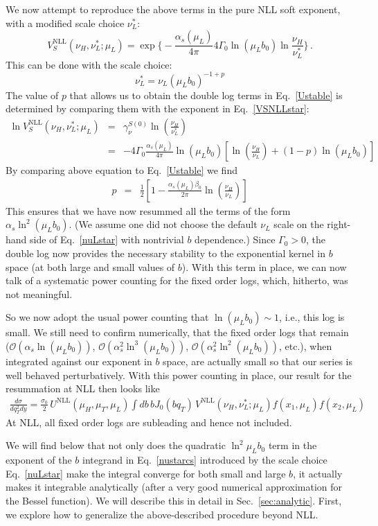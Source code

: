 \documentclass[a4,letterpaper,11pt]{article}
\newcommand{\nn}{\nonumber}
\newcommand{\be}{\begin{equation}}
\newcommand{\ee}{\end{equation}}
\newcommand{\bea}{\begin{eqnarray}}
\newcommand{\eea}{\end{eqnarray}}
\newcommand{\as}{\alpha_s}
\newcommand{\cO}{\mathcal{O}}
\newcommand{\eq}[1]{Eq.~\eqref{#1}}
\renewcommand{\sec}[1]{Sec.~\ref{sec:#1}}
\begin{document}
We now attempt to reproduce the above terms in the pure NLL soft exponent, with a modified scale choice $\nu_L^*$: 
\be
\label{VSNLLstar}
V_S^{\text{NLL}}(\nu_H,\nu_L^*;\mu_L)  =\exp\biggl\{ - \frac{\as(\mu_L)}{4\pi}4\Gamma_0 \ln(\mu_L b_0) \ln\frac{\nu_H}{\nu_L^*}\biggr\}\,.
\ee
This can be done with the scale choice:
\be\label{nuLstar}
  \nu_L^* = \nu_L (\mu_L b_0)^{-1+p} 
\ee 
The value of $p$ that allows us to obtain the double log terms in \eq{Ustable} is determined by comparing them with the exponent in \eq{VSNLLstar}: 
\bea \label{VSNLL}
\ln V_S^\text{NLL}(\nu_H,\nu_L^*;\mu_L) &= & \gamma_\nu^{S (0)} \ln\left(\frac{\nu_H}{\nu_L^*}\right)
\nn\\
&=& -4\Gamma_0 \frac{\as(\mu_L)}{4\pi}\ln(\mu_L b_0) \left[
\ln\left(\frac{\nu_H}{\nu_L}\right)+(1-p)\ln(\mu_L b_0)
\right]
\eea
By comparing above equation to \eq{Ustable} we find
\bea
p&=& 
\frac{1}{2}\left[1-  \frac{\as(\mu_L) \beta_0}{2\pi}\ln\left(\frac{\nu_H}{\nu_L}\right)\right]
\label{eq:n}
\eea
This ensures that we have now resummed all the terms of the form $\as \ln^2(\mu_L b_0)$. (We assume one did not choose the default $\nu_L$ scale on the right-hand side of \eq{nuLstar} with nontrivial $b$ dependence.)
Since $\Gamma_0>0$, the double log now provides the necessary stability to the exponential kernel in $b$ space (at both large and small values of $b$). With this term in place, we can now talk of a systematic power counting for the fixed order logs, which, hitherto, was not meaningful. 


So we now  adopt the usual power counting that $\ln(\mu_L b_0) \sim 1$, i.e., this log is small. We still need to confirm numerically, that the fixed order logs that remain ($\cO(\as\ln(\mu_L b_0))$, $\cO(\as^2 \ln^3(\mu_L b_0))$, $\cO(\as^2 \ln^2(\mu_L b_0))$, etc.), when integrated against our exponent in $b$ space, are actually small so that our series is well behaved perturbatively. With this power counting in place, our result for the resummation at NLL then looks like 
\bea
\label{nustarcs}
\frac{d \sigma}{d q_T^2 dy} =\frac{\sigma_0}{2}\,  U^{\text{NLL}}(\mu_H, \mu_T, \mu_L) \int db \, b J_0(b q_T)\, V^{\text{NLL}}(\nu_H,\nu_L^*;\mu_L)f(x_1,\mu_L)f(x_2,\mu_L)
\eea
At NLL, all fixed order logs are subleading and hence not included. 

We will find below that not only does the quadratic $\ln^2\mu_L b_0$ term in the exponent of the $b$ integrand in \eq{nustarcs} introduced by the scale choice \eq{nuLstar} make the integral converge for both small and large $b$, it actually makes it integrable analytically (after a very good numerical approximation for the Bessel function). We will describe this in detail in \sec{analytic}. First, we explore how to generalize the above-described procedure beyond NLL.
\end{document}
